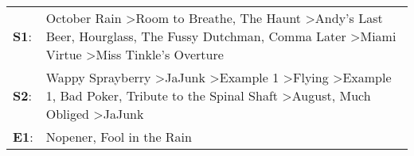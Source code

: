\begin{supertabular}{p{0.03\textwidth}p{0.92\textwidth}}
 \textbf{S1}:  &                                     October Rain\textsuperscript{} \textgreater \enspace Room to Breathe\textsuperscript{}, \enspace The Haunt\textsuperscript{} \textgreater \enspace Andy's Last Beer\textsuperscript{}, \enspace Hourglass\textsuperscript{}, \enspace The Fussy Dutchman\textsuperscript{}, \enspace Comma Later\textsuperscript{} \textgreater \enspace Miami Virtue\textsuperscript{} \textgreater \enspace Miss Tinkle's Overture\textsuperscript{}  \enspace  \\
 \textbf{S2}:  &  Wappy Sprayberry\textsuperscript{} \textgreater \enspace JaJunk\textsuperscript{} \textgreater \enspace Example 1\textsuperscript{} \textgreater \enspace Flying\textsuperscript{} \textgreater \enspace Example 1\textsuperscript{}, \enspace Bad Poker\textsuperscript{}, \enspace Tribute to the Spinal Shaft\textsuperscript{} \textgreater \enspace August\textsuperscript{}, \enspace Much Obliged\textsuperscript{} \textgreater \enspace JaJunk\textsuperscript{}  \enspace  \\
 \textbf{E1}:  &                                                                                                                                                                                                                                                                                                                                                                                                     Nopener\textsuperscript{}, \enspace Fool in the Rain\textsuperscript{}  \enspace  \\
\end{supertabular}
